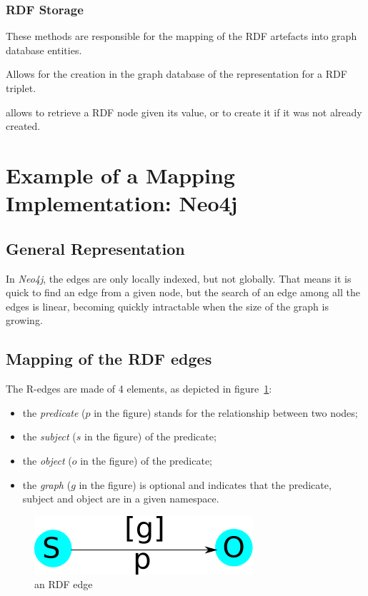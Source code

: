 \documentclass[12pt,a4paper]{memoir} %
\begin{document}
\subsubsection{RDF Storage}
These methods are responsible for the mapping of the RDF artefacts into graph database entities.
\begin{description}[align=left]
	\item[createRelationship] Allows for the creation in the graph database of the representation for a RDF triplet.
	\item[createOrGetNode(Value v)] allows to retrieve a RDF node given its value, or to create it if it was not already created. 
\end{description}

\section{Example of a Mapping Implementation: Neo4j}

    \subsection{General Representation}
In \textit{Neo4j}, the edges are only locally indexed, but not globally. 
That means it is quick to find an edge from a given node, but the search of an edge among all the edges is linear, becoming quickly intractable when the size of the graph is growing.


\subsection{Mapping of the RDF edges}
The R-edges are made of 4 elements, as depicted in figure~\ref{fig:anRdfEdge}:
\begin{itemize}
\item the \textit{predicate} ($p$ in the figure) stands for the relationship between two nodes;
\item the \textit{subject} ($s$ in the figure) of the predicate;
\item the \textit{object} ($o$ in the figure) of the predicate;
\item the \textit{graph} ($g$ in the figure) is optional and indicates that the predicate, subject and object are in a given namespace.
\end{itemize}

\begin{figure}[hbtp]
\centering
\includegraphics[scale=0.5]{figures/anRdfEdge.png}
\caption{an RDF edge}
\label{fig:anRdfEdge}
\end{figure}
\end{document}
